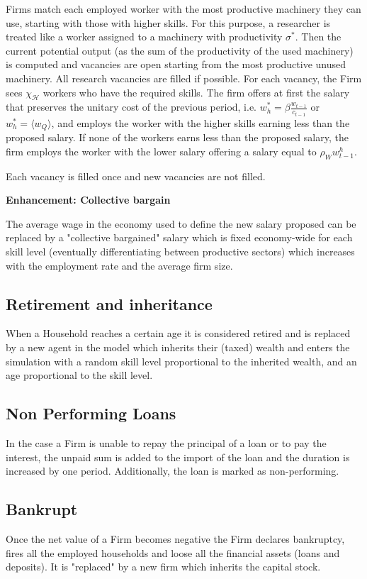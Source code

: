 \documentclass[a4paper, headings=standardclasses]{scrartcl}
\newenvironment{enh}[1][]{\begin{framed}\noindent\textbf{Enhancement: #1}\par}{\end{framed}}
\begin{document}
Firms match each employed worker with the most productive machinery they can use, starting with those with higher skills. For this purpose, a researcher is treated like a worker assigned to a machinery with productivity $\sigma^*$.
Then the current potential output (as the sum of the productivity of the used machinery) is computed and vacancies are open starting from the most productive unused machinery. All research vacancies are filled if possible.
For each vacancy, the Firm sees $\chi_\mathcal{H}$ workers who have the required skills. The firm offers at first the salary that preserves the unitary cost of the previous period, i.e. $w^*_h = \beta \frac{w_{t-1}}{c_{t-1}}$ or $w^*_h = \langle w_Q \rangle$, and employs the worker with the higher skills earning less than the proposed salary. If none of the workers earns less than the proposed salary, the firm employs the worker with the lower salary offering a salary equal to $\rho_W w^h_{t-1}$.

Each vacancy is filled once and new vacancies are not filled.

\begin{enh}[Collective bargain]
    The average wage in the economy used to define the new salary proposed can be replaced by a "collective bargained" salary which is fixed economy-wide for each skill level (eventually differentiating between productive sectors) which increases with the employment rate and the average firm size.
\end{enh}

\subsection{Retirement and inheritance}
When a Household reaches a certain age it is considered retired and is replaced by a new agent in the model which inherits their (taxed) wealth and enters the simulation with a random skill level proportional to the inherited wealth, and an age proportional to the skill level.

\subsection{Non Performing Loans}
In the case a Firm is unable to repay the principal of a loan or to pay the interest, the unpaid sum is added to the import of the loan and the duration is increased by one period. Additionally, the loan is marked as non-performing.

\subsection{Bankrupt}
Once the net value of a Firm becomes negative the Firm declares bankruptcy, fires all the employed households and loose all the financial assets (loans and deposits). It is "replaced" by a new firm which inherits the capital stock.
\end{document}
